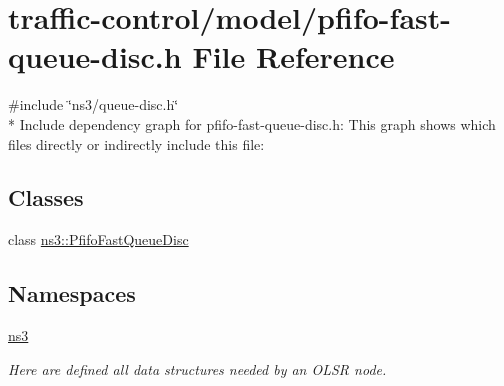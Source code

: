\hypertarget{pfifo-fast-queue-disc_8h}{}\section{traffic-\/control/model/pfifo-\/fast-\/queue-\/disc.h File Reference}
\label{pfifo-fast-queue-disc_8h}
{\ttfamily \#include \char`\"{}ns3/queue-\/disc.\+h\char`\"{}}\\*
Include dependency graph for pfifo-\/fast-\/queue-\/disc.h\+:
This graph shows which files directly or indirectly include this file\+:
\subsection*{Classes}
\begin{DoxyCompactItemize}
\item 
class \hyperlink{classns3_1_1PfifoFastQueueDisc}{ns3\+::\+Pfifo\+Fast\+Queue\+Disc}
\end{DoxyCompactItemize}
\subsection*{Namespaces}
\begin{DoxyCompactItemize}
\item 
 \hyperlink{namespacens3}{ns3}
\begin{DoxyCompactList}\small\item\em Here are defined all data structures needed by an O\+L\+SR node. \end{DoxyCompactList}\end{DoxyCompactItemize}
